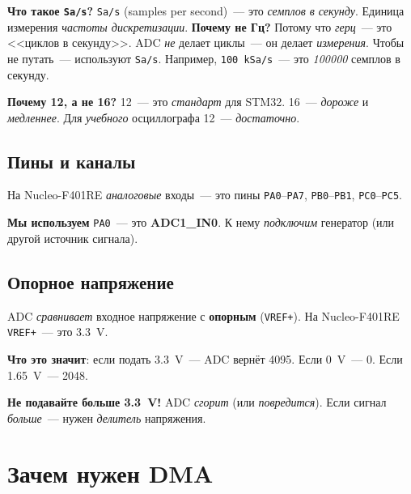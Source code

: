 \begin{notebox}
\textbf{Что такое \texttt{Sa/s}?} \texttt{Sa/s} (samples per second)~---
это \emph{семплов в секунду}. Единица измерения \emph{частоты
дискретизации}. \textbf{Почему не Гц?} Потому что \emph{герц}~---
это <<циклов в секунду>>. ADC \emph{не} делает циклы~---
он делает \emph{измерения}. Чтобы не путать~--- используют
\texttt{Sa/s}. Например, \texttt{100 kSa/s}~--- это
\emph{100000} семплов в секунду.
\end{notebox}

\begin{keybox}
\textbf{Почему \SI{12}{\bit}, а не \SI{16}{\bit}?} \SI{12}{\bit}~---
это \emph{стандарт} для STM32. \SI{16}{\bit}~--- \emph{дороже}
и \emph{медленнее}. Для \emph{учебного} осциллографа
\SI{12}{\bit}~--- \emph{достаточно}.
\end{keybox}

\subsection{Пины и каналы}

На Nucleo-F401RE \emph{аналоговые} входы~--- это пины
\texttt{PA0}--\texttt{PA7}, \texttt{PB0}--\texttt{PB1},
\texttt{PC0}--\texttt{PC5}.

\textbf{Мы используем} \texttt{PA0}~--- это \textbf{ADC1\_IN0}.
К нему \emph{подключим} генератор (или другой источник
сигнала).

\subsection{Опорное напряжение}

ADC \emph{сравнивает} входное напряжение с \textbf{опорным}
(\texttt{VREF+}). На Nucleo-F401RE \texttt{VREF+}~---
это \SI{3.3}{\volt}.

\textbf{Что это значит}: если подать \SI{3.3}{\volt}~---
ADC вернёт \num{4095}. Если \SI{0}{\volt}~--- \num{0}.
Если \SI{1.65}{\volt}~--- \num{2048}.

\begin{warnbox}
\textbf{Не подавайте больше \SI{3.3}{\volt}!} ADC \emph{сгорит}
(или \emph{повредится}). Если сигнал \emph{больше}~---
нужен \emph{делитель} напряжения.
\end{warnbox}

\section{Зачем нужен DMA}
\label{sec:dma-why}

